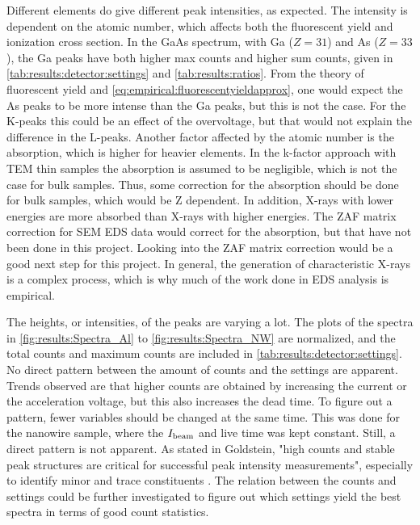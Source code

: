Different elements do give different peak intensities, as expected.
The intensity is dependent on the atomic number, which affects both the fluorescent yield and ionization cross section.
In the GaAs spectrum, with Ga ($Z=31$) and As ($Z=33$), the Ga peaks have both higher max counts and higher sum counts, given in \cref{tab:results:detector:settings} and \cref{tab:results:ratios}.
From the theory of fluorescent yield and \cref{eq:empirical:fluorescentyieldapprox}, one would expect the As peaks to be more intense than the Ga peaks, but this is not the case.
For the K-peaks this could be an effect of the overvoltage, but that would not explain the difference in the L-peaks.
Another factor affected by the atomic number is the absorption, which is higher for heavier elements.
In the k-factor approach with TEM thin samples the absorption is assumed to be negligible, which is not the case for bulk samples.
Thus, some correction for the absorption should be done for bulk samples, which would be Z dependent.
In addition, X-rays with lower energies are more absorbed than X-rays with higher energies.
The ZAF matrix correction for SEM EDS data would correct for the absorption, but that have not been done in this project.
Looking into the ZAF matrix correction would be a good next step for this project.
In general, the generation of characteristic X-rays is a complex process, which is why much of the work done in EDS analysis is empirical.


The heights, or intensities, of the peaks are varying a lot.
The plots of the spectra in \cref{fig:results:Spectra_Al} to \cref{fig:results:Spectra_NW} are normalized, and the total counts and maximum counts are included in \cref{tab:results:detector:settings}.
No direct pattern between the amount of counts and the settings are apparent.
Trends observed are that higher counts are obtained by increasing the current or the acceleration voltage, but this also increases the dead time.
To figure out a pattern, fewer variables should be changed at the same time.
This was done for the nanowire sample, where the $I_\textnormal{beam}$ and live time was kept constant.
Still, a direct pattern is not apparent.
As stated in Goldstein, "high counts and stable peak structures are critical for successful peak intensity measurements", especially to identify minor and trace constituents \cite[page 318]{goldstein_scanning_2018}.
The relation between the counts and settings could be further investigated to figure out which settings yield the best spectra in terms of good count statistics.

